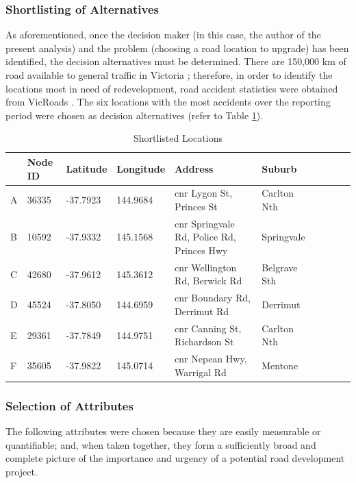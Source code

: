 \documentclass[11pt, a4paper]{article}
\begin{document}
    \subsubsection{Shortlisting of Alternatives}

    As aforementioned, once the decision maker (in this case, the author of the present analysis) and the problem (choosing a road location to upgrade) has been identified, the decision alternatives must be determined. There are 150,000 km of road available to general traffic in Victoria \parencite{a14}; therefore, in order to identify the locations most in need of redevelopment, road accident statistics were obtained from VicRoads \parencite{a3}. The six locations with the most accidents over the reporting period were chosen as decision alternatives (refer to Table \ref{t4}).

    \begin{table}[!ht]
        \centering
        \begin{tabular}{|l|l|l|l|l|l|l|l|l|l|}
        \hline
            ~ & Node ID & Latitude & Longitude & Address    & Suburb   \\ \hline
            A & 36335 & -37.7923 & 144.9684 & cnr Lygon St, Princes St    & Carlton Nth   \\ \hline
            B & 10592 & -37.9332 & 145.1568 & cnr Springvale Rd, Police Rd, Princes Hwy    & Springvale   \\ \hline
            C & 42680 & -37.9612 & 145.3612 & cnr Wellington Rd, Berwick Rd    & Belgrave Sth   \\ \hline
            D & 45524 & -37.8050 & 144.6959 & cnr Boundary Rd, Derrimut Rd    & Derrimut   \\ \hline
            E & 29361 & -37.7849 & 144.9751 & cnr Canning St, Richardson St    & Carlton Nth   \\ \hline
            F & 35605 & -37.9822 & 145.0714 & cnr Nepean Hwy, Warrigal Rd    & Mentone   \\ \hline
        \end{tabular}
        \caption{Shortlisted Locations}
        \label{t4}
    \end{table}

    \subsubsection{Selection of Attributes}

    The following attributes were chosen because they are easily measurable or quantifiable; and, when taken together, they form a sufficiently broad and complete picture of the importance and urgency of a potential road development project.
\end{document}
